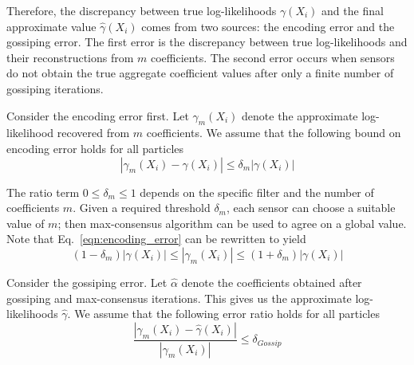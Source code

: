 \documentclass[10pt,letterpaper,final]{article}
\begin{document}
Therefore, the discrepancy between true log-likelihoods $\gamma(X_i)$ and the final approximate value $\hat{\gamma}(X_i)$ comes from two sources: the encoding error and the gossiping error. The first error is the discrepancy between true log-likelihoods and their reconstructions from $m$ coefficients. The second error occurs when sensors do not obtain the true aggregate coefficient values after only a finite number of gossiping iterations. 

Consider the encoding error first. Let $\gamma_m(X_i)$ denote the approximate log-likelihood recovered from $m$ coefficients. We assume that the following bound on encoding error holds for all particles
\begin{equation}
|\gamma_{m}(X_i) - \gamma(X_i)|\leq \delta_m|\gamma(X_i)| 
\label{eqn:encoding_error}
\end{equation}




The ratio term $0\leq \delta_m\leq 1$ depends on the specific filter and the number of coefficients $m$. Given a required threshold $\delta_m$, each sensor can choose a suitable value of $m$; then max-consensus algorithm can be used to agree on a global value. Note that Eq.~\eqref{eqn:encoding_error} can be rewritten to yield
\begin{equation}
(1-\delta_m)|\gamma(X_i)| \leq |\gamma_m(X_i)| \leq (1+\delta_m)|\gamma(X_i)|
\end{equation}

Consider the gossiping error. Let $\hat{\alpha}$ denote the coefficients obtained after gossiping and max-consensus iterations. This gives us the approximate log-likelihoods $\hat{\gamma}$. We assume that the following error ratio holds for all particles
\begin{equation}
\frac{|\gamma_m(X_i)-\hat{\gamma}(X_i)|}{|\gamma_m(X_i)|} \leq \delta_{Gossip}
\label{eqn:gossiping_error}
\end{equation}
\end{document}
